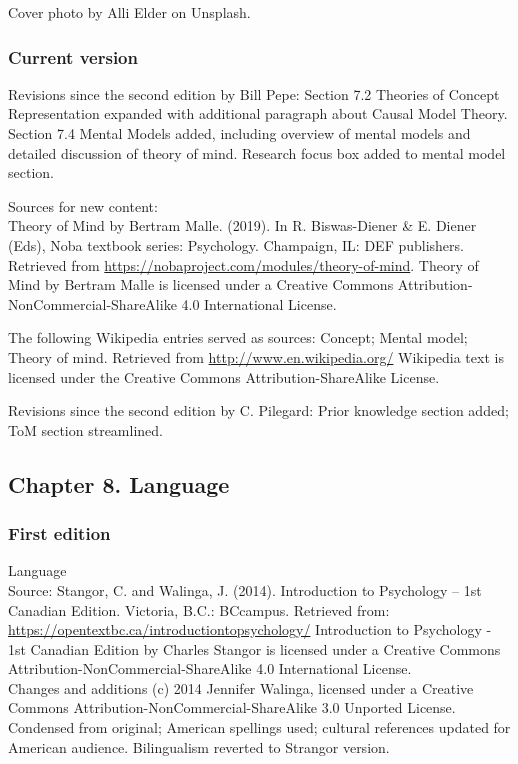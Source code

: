 \documentclass[
]{krantz}
\begin{document}
Cover photo by Alli Elder on Unsplash.

\subsubsection*{Current version}\label{current-version-3}


Revisions since the second edition by Bill Pepe: Section 7.2 Theories of Concept Representation expanded with additional paragraph about Causal Model Theory. Section 7.4 Mental Models added, including overview of mental models and detailed discussion of theory of mind. Research focus box added to mental model section.

Sources for new content:\\
Theory of Mind by Bertram Malle. (2019). In R. Biswas-Diener \& E. Diener (Eds), Noba textbook series: Psychology. Champaign, IL: DEF publishers. Retrieved from \url{https://nobaproject.com/modules/theory-of-mind}.
Theory of Mind by Bertram Malle is licensed under a Creative Commons Attribution-NonCommercial-ShareAlike 4.0 International License.

The following Wikipedia entries served as sources: Concept; Mental model; Theory of mind. Retrieved from \url{http://www.en.wikipedia.org/}
Wikipedia text is licensed under the Creative Commons Attribution-ShareAlike License.

Revisions since the second edition by C. Pilegard: Prior knowledge section added; ToM section streamlined.

\subsection*{Chapter 8. Language}\label{chapter-8.-language}


\subsubsection*{First edition}\label{first-edition-8}


Language\\
Source: Stangor, C. and Walinga, J. (2014). Introduction to Psychology -- 1st Canadian Edition. Victoria, B.C.: BCcampus. Retrieved from: \url{https://opentextbc.ca/introductiontopsychology/}
Introduction to Psychology - 1st Canadian Edition by Charles Stangor is licensed under a Creative Commons Attribution-NonCommercial-ShareAlike 4.0 International License.\\
Changes and additions (c) 2014 Jennifer Walinga, licensed under a Creative Commons Attribution-NonCommercial-ShareAlike 3.0 Unported License.\\
Condensed from original; American spellings used; cultural references updated for American audience. Bilingualism reverted to Strangor version.
\end{document}
